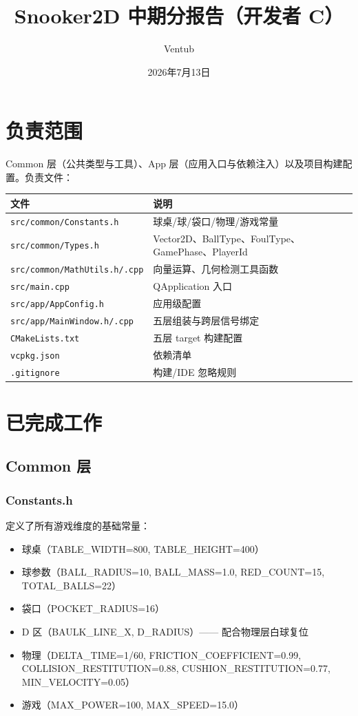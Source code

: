\documentclass[11pt]{ctexart}
\title{Snooker2D 中期分报告（开发者 C）}
\author{Ventub}
\date{2026年7月13日}
\begin{document}
\maketitle

\section{负责范围}

Common 层（公共类型与工具）、App 层（应用入口与依赖注入）以及项目构建配置。负责文件：

\begin{center}
\begin{tabular}{|l|l|}
\hline
\textbf{文件} & \textbf{说明} \\
\hline
\texttt{src/common/Constants.h} & 球桌/球/袋口/物理/游戏常量 \\
\texttt{src/common/Types.h} & Vector2D、BallType、FoulType、GamePhase、PlayerId \\
\texttt{src/common/MathUtils.h/.cpp} & 向量运算、几何检测工具函数 \\
\texttt{src/main.cpp} & QApplication 入口 \\
\texttt{src/app/AppConfig.h} & 应用级配置 \\
\texttt{src/app/MainWindow.h/.cpp} & 五层组装与跨层信号绑定 \\
\texttt{CMakeLists.txt} & 五层 target 构建配置 \\
\texttt{vcpkg.json} & 依赖清单 \\
\texttt{.gitignore} & 构建/IDE 忽略规则 \\
\hline
\end{tabular}
\end{center}

\section{已完成工作}

\subsection{Common 层}

\subsubsection{Constants.h}

定义了所有游戏维度的基础常量：

\begin{itemize}
\item 球桌（TABLE\_WIDTH=800, TABLE\_HEIGHT=400）
\item 球参数（BALL\_RADIUS=10, BALL\_MASS=1.0, RED\_COUNT=15, TOTAL\_BALLS=22）
\item 袋口（POCKET\_RADIUS=16）
\item D 区（BAULK\_LINE\_X, D\_RADIUS）—— 配合物理层白球复位
\item 物理（DELTA\_TIME=1/60, FRICTION\_COEFFICIENT=0.99, COLLISION\_RESTITUTION=0.88, CUSHION\_RESTITUTION=0.77, MIN\_VELOCITY=0.05）
\item 游戏（MAX\_POWER=100, MAX\_SPEED=15.0）
\end{itemize}
\end{document}
